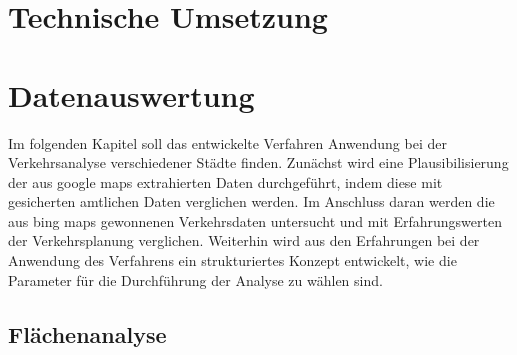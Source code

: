 \documentclass[12pt,a4paper]{scrartcl}
\begin{document}
\newpage  
\section{Technische Umsetzung}


\newpage
\section{Datenauswertung}

Im folgenden Kapitel soll das entwickelte Verfahren Anwendung bei der Verkehrsanalyse verschiedener Städte finden. Zunächst wird eine Plausibilisierung der aus google maps extrahierten Daten durchgeführt, indem diese mit gesicherten amtlichen Daten verglichen werden. 
Im Anschluss daran werden die aus bing maps gewonnenen Verkehrsdaten untersucht und mit Erfahrungswerten der Verkehrsplanung verglichen.
Weiterhin wird aus den Erfahrungen bei der Anwendung des Verfahrens ein strukturiertes Konzept entwickelt, wie die Parameter für die Durchführung der Analyse zu wählen sind.

\subsection{Flächenanalyse}
\end{document}
